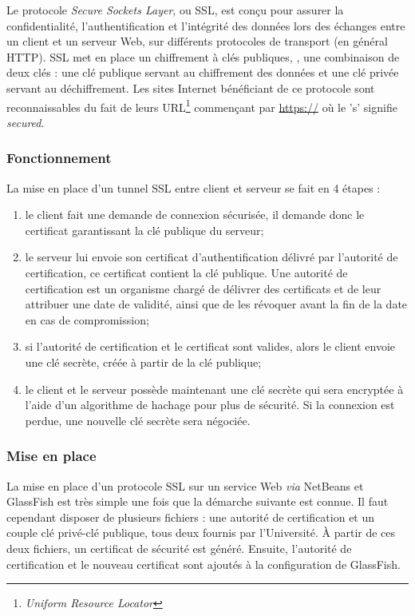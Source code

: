 Le protocole \textit{Secure Sockets Layer}, ou SSL, est con\c{c}u pour assurer la confidentialit\'e, l'authentification et l'int\'egrit\'e des donn\'ees lors des \'echanges entre un client et un serveur Web, sur diff\'erents protocoles de transport (en g\'en\'eral HTTP).
SSL met en place un chiffrement \`a cl\'es publiques, \cad, une combinaison de deux cl\'es : une cl\'e publique servant au chiffrement des donn\'ees et une cl\'e priv\'ee servant au d\'echiffrement.
Les sites Internet b\'en\'eficiant de ce protocole sont reconnaissables du fait de leurs URL\protect\footnote{\textit{Uniform Resource Locator}} commen\c{c}ant par \url{https://} o\`u le 's' signifie \textit{secured}.

\subsubsection{Fonctionnement}

\noindent La mise en place d'un tunnel SSL entre client et serveur se fait en 4 \'etapes :

\begin{enumerate}
	\item le client fait une demande de connexion s\'ecuris\'ee, il demande donc le certificat garantissant la cl\'e publique du serveur;
	\item le serveur lui envoie son certificat d'authentification d\'elivr\'e par l'autorit\'e de certification, ce certificat contient la cl\'e publique.
	Une autorit\'e de certification est un organisme charg\'e de d\'elivrer des certificats et de leur attribuer une date de validit\'e, ainsi que de les r\'evoquer avant la fin de la date en cas de compromission;
	\item si l'autorit\'e de certification et le certificat sont valides, alors le client envoie une cl\'e secr\`ete, cr\'e\'ee \`a partir de la cl\'e publique;
	\item le client et le serveur poss\`ede maintenant une cl\'e secr\`ete qui sera encrypt\'ee \`a l'aide d'un algorithme de hachage pour plus de s\'ecurit\'e.
	Si la connexion est perdue, une nouvelle cl\'e secr\`ete sera n\'egoci\'ee.

\end{enumerate}

\subsubsection{Mise en place}

La mise en place d'un protocole SSL sur un service Web \textit{via} NetBeans et GlassFish est tr\`es simple une fois que la d\'emarche suivante est connue.
Il faut cependant disposer de plusieurs fichiers : une autorit\'e de certification et un couple cl\'e priv\'e-cl\'e publique, tous deux fournis par l'Universit\'e.
\`A partir de ces deux fichiers, un certificat de s\'ecurit\'e est g\'en\'er\'e.
Ensuite, l'autorit\'e de certification et le nouveau certificat sont ajout\'es \`a la configuration de GlassFish.

